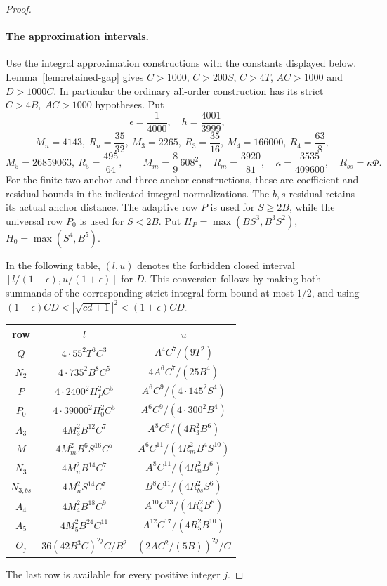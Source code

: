 \documentclass[12pt]{article}
\numberwithin{equation}{section}
\begin{document}
\begin{proof}
\paragraph{The approximation intervals.}
Use the integral approximation constructions with the constants displayed
below. Lemma~\ref{lem:retained-gap} gives
$C>1000$, $C>200S$, $C>4T$, $AC>1000$ and $D>1000C$.
In particular the ordinary all-order construction has its strict
\(C>4B,\ AC>1000\) hypotheses. Put
\[
 \epsilon=\frac1{4000},\quad h=\frac{4001}{3999},\quad
\]\[
 M_n=4143,\ R_n=\frac{35}{32},\
 M_3=2265,\ R_3=\frac{35}{16},\
 M_4=166000,\ R_4=\frac{63}{8},
\]
\[
 M_5=26859063,\ R_5=\frac{495}{64},\qquad
 M_m=\frac89\,608^2,\quad R_m=\frac{3920}{81},\quad
 \kappa=\frac{3535}{409600},\quad R_{bs}=\kappa\Phi.
\]
For the finite two-anchor and three-anchor constructions, these are
coefficient and residual bounds in the indicated integral normalizations.
The \(b,s\) residual retains its actual anchor distance. The adaptive
row \(P\) is used for \(S\ge2B\), while the universal row \(P_0\)
is used for \(S<2B\). Put
\(H_P=\max(BS^3,B^3S^2)\), \(H_0=\max(S^4,B^5)\).

In the following table, \((l,u)\) denotes the forbidden closed interval
\([l/(1-\epsilon),u/(1+\epsilon)]\) for \(D\). This conversion follows
by making both summands of the corresponding strict integral-form
bound at most \(1/2\), and using
\((1-\epsilon)CD<|\sqrt{cd+1}|^2<(1+\epsilon)CD\).
\begin{center}\small
\begin{tabular}{c|c|c}
row&\(l\)&\(u\)\\\hline
\(Q\)&\(4\cdot55^2T^6C^3\)&\(A^4C^7/(9T^2)\)\\
\(N_2\)&\(4\cdot735^2B^8C^5\)&\(4A^6C^7/(25B^4)\)\\
\(P\)&\(4\cdot2400^2H_P^2C^5\)&\(A^6C^9/(4\cdot145^2S^4)\)\\
\(P_0\)&\(4\cdot39000^2H_0^2C^5\)&\(A^6C^9/(4\cdot300^2B^4)\)\\
\(A_3\)&\(4M_3^2B^{12}C^7\)&\(A^8C^9/(4R_3^2B^6)\)\\
\(M\)&\(4M_m^2B^6S^{16}C^5\)&\(A^6C^{11}/(4R_m^2B^4S^{10})\)\\
\(N_3\)&\(4M_n^2B^{14}C^7\)&\(A^8C^{11}/(4R_n^2B^6)\)\\
\(N_{3,bs}\)&\(4M_n^2S^{14}C^7\)&\(B^8C^{11}/(4R_{bs}^2S^6)\)\\
\(A_4\)&\(4M_4^2B^{18}C^9\)&\(A^{10}C^{13}/(4R_4^2B^8)\)\\
\(A_5\)&\(4M_5^2B^{24}C^{11}\)&\(A^{12}C^{17}/(4R_5^2B^{10})\)\\
\(O_j\)&\(36(42B^3C)^{2j}C/B^2\)&\((2AC^2/(5B))^{2j}/C\)
\end{tabular}
\end{center}
The last row is available for every positive integer \(j\).


\end{proof}
\end{document}
